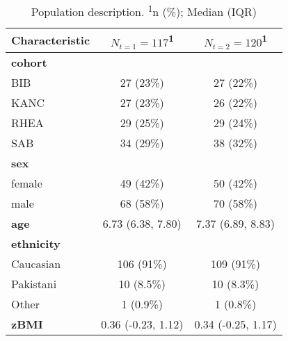 \documentclass{article}
\begin{document}
\begin{table}[]
	\centering
	\begin{tabularx}{\linewidth}{lcc}
		\textbf{Characteristic} & $N_{t=1} = 117$\textsuperscript{1} & $N_{t=2} = 120$\textsuperscript{1} \\ 
		\hline
		\textbf{cohort} & & \\ 
		\enspace BIB & 27 (23\%) & 27 (22\%) \\ 
		\enspace KANC & 27 (23\%) & 26 (22\%) \\ 
		\enspace RHEA & 29 (25\%) & 29 (24\%) \\ 
		\enspace SAB & 34 (29\%) & 38 (32\%) \\ 
		\textbf{sex} &  \\ 
		\enspace female & 49 (42\%) & 50 (42\%) \\ 
		\enspace male & 68 (58\%) & 70 (58\%) \\ 
		\textbf{age} & 6.73 (6.38, 7.80) & 7.37 (6.89, 8.83) \\ 
		\textbf{ethnicity} &  \\ 
		\enspace Caucasian & 106 (91\%) & 109 (91\%) \\ 
		\enspace Pakistani & 10 (8.5\%) & 10 (8.3\%) \\ 
		\enspace Other & 1 (0.9\%) & 1 (0.8\%) \\ 
		\textbf{zBMI} & 0.36 (-0.23, 1.12) & 0.34 (-0.25, 1.17) \\ 
	\end{tabularx}
	\caption{Population description. \textsuperscript{1}n (\%); Median (IQR)}
\end{table}
\end{document}
